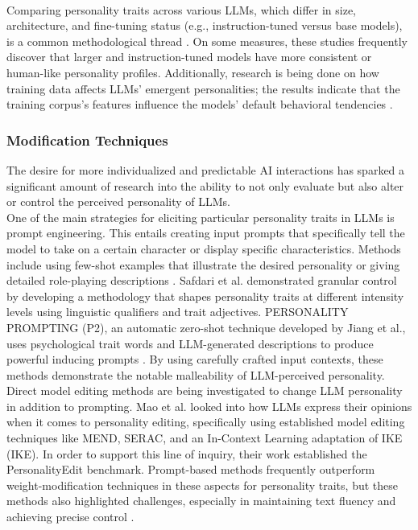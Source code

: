 \documentclass{DESSThesis}
\begin{document}
\\
Comparing personality traits across various LLMs, which differ in size, architecture, and fine-tuning status (e.g., instruction-tuned versus base models), is a common methodological thread \cite{bodroza_personality_2024,hilliard_eliciting_2024,sorokovikova_llms_2024,safdari_personality_2023,tommaso_llms_2024}. On some measures, these studies frequently discover that larger and instruction-tuned models have more consistent or human-like personality profiles. Additionally, research is being done on how training data affects LLMs' emergent personalities; the results indicate that the training corpus's features influence the models' default behavioral tendencies \cite{chang_language_2023,pan_llms_2023}.

\subsubsection{Modification Techniques}
The desire for more individualized and predictable AI interactions has sparked a significant amount of research into the ability to not only evaluate but also alter or control the perceived personality of LLMs.
\\
One of the main strategies for eliciting particular personality traits in LLMs is prompt engineering. This entails creating input prompts that specifically tell the model to take on a certain character or display specific characteristics. Methods include using few-shot examples that illustrate the desired personality or giving detailed role-playing descriptions \cite{pan_llms_2023,caron_manipulating_2023}. Safdari et al. demonstrated granular control by developing a methodology that shapes personality traits at different intensity levels using linguistic qualifiers and trait adjectives. PERSONALITY PROMPTING (P2), an automatic zero-shot technique developed by Jiang et al., uses psychological trait words and LLM-generated descriptions to produce powerful inducing prompts \cite{jiang_personallm_2024}. By using carefully crafted input contexts, these methods demonstrate the notable malleability of LLM-perceived personality.
\\
Direct model editing methods are being investigated to change LLM personality in addition to prompting. Mao et al. looked into how LLMs express their opinions when it comes to personality editing, specifically using established model editing techniques like MEND, SERAC, and an In-Context Learning adaptation of IKE (IKE). In order to support this line of inquiry, their work established the PersonalityEdit benchmark. Prompt-based methods frequently outperform weight-modification techniques in these aspects for personality traits, but these methods also highlighted challenges, especially in maintaining text fluency and achieving precise control \cite{mao_editing_2024}.
\end{document}
